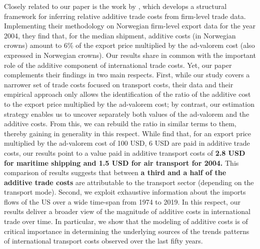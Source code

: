 \documentclass[a4paper,11pt]{article}
\begin{document}
Closely related to our paper is the work by \cite{Irrazabal_2015}, which develops a structural framework for inferring relative additive trade costs from firm-level trade data.
Implementing their methodology on Norwegian firm-level export data for the year 2004, they find that, for the median shipment, additive costs (in Norwegian crowns) amount to 6\% of the export price multiplied by the ad-valorem cost (also expressed in Norwegian crowns).
Our results share in common with \cite{Irrazabal_2015} the important role of the additive component of international trade costs.
Yet, our paper complements their findings in two main respects.
First, while our study covers a narrower set of trade costs focused on transport costs, their data and their empirical approach only allows the identification of the ratio of the additive cost to the export price multiplied by the ad-valorem cost; by contrast, our estimation strategy enables us to uncover separately both values of the ad-valorem and the additive costs.
From this, we can rebuild the ratio in similar terms to them, thereby gaining in generality in this respect.
While \cite{Irrazabal_2015} find that, for an export price multiplied by the ad-valorem cost of 100 USD, 6 USD are paid in additive trade costs, our results point to a value paid in additive transport costs of \textbf{2.8 USD for maritime shipping and 1.5 USD for air transport for 2004.}
This comparison of results suggests that between \textbf{a third and a half of the additive trade costs} are attributable to the transport sector (depending on the transport mode).
Second, we exploit exhaustive information about the imports flows of the US over a wide time-span from 1974 to 2019.
In this respect, our results deliver a broader view of the magnitude of additive costs in international trade over time.
In particular, we show that the modeling of additive costs is of critical importance in determining the underlying sources of the trends patterns of international transport costs observed over the last fifty years.
\end{document}
